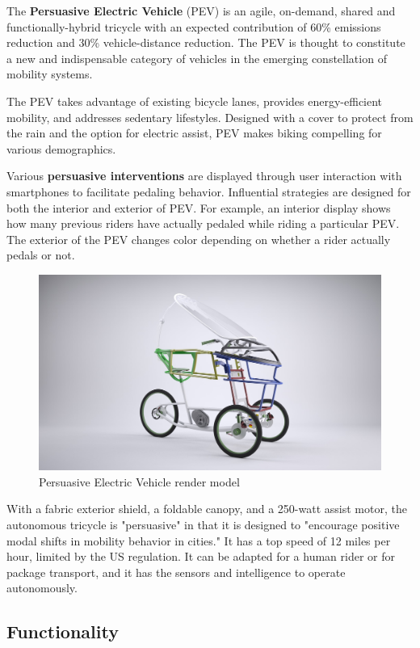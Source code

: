 \newpage
The \textbf{Persuasive Electric Vehicle}\cite{pev} (PEV) is an agile, on-demand, shared and functionally-hybrid tricycle with an expected contribution of 60\% emissions reduction and 30\% vehicle-distance reduction. The PEV is thought to constitute a new and indispensable category of vehicles in the emerging constellation of mobility systems. 

The PEV takes advantage of existing bicycle lanes, provides energy-efficient mobility, and addresses sedentary lifestyles. Designed with a cover to protect from the rain and the option for electric assist, PEV makes biking compelling for various demographics. 

Various \textbf{persuasive interventions} are displayed through user interaction with smartphones to facilitate pedaling behavior. Influential strategies are designed for both the interior and exterior of PEV. For example, an interior display shows how many previous riders have actually pedaled while riding a particular PEV. The exterior of the PEV changes color depending on whether a rider actually pedals or not.

\begin{figure}
	\includegraphics[width=\linewidth]{figs/01/pev_5}
	\caption{Persuasive Electric Vehicle render model}
\end{figure}

With a fabric exterior shield, a foldable canopy, and a 250-watt assist motor, the autonomous tricycle is "persuasive" in that it is designed to "encourage positive modal shifts in mobility behavior in cities." It has a top speed of 12 miles per hour, limited by the US regulation. It can be adapted for a human rider or for package transport, and it has the sensors and intelligence to operate autonomously.
 
\newpage
\subsection{Functionality}

